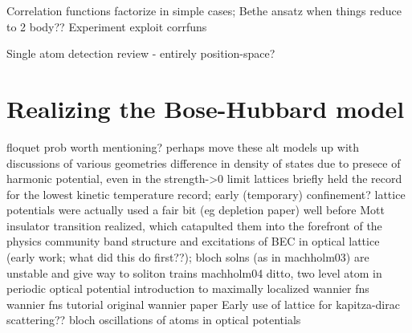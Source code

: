 		Correlation functions factorize in simple cases; Bethe ansatz when things reduce to 2 body??
		Experiment exploit corrfuns 
			\cite{schweigler17}
			\cite{hodgman17}

			Single atom detection
	\cite{ott16} review - entirely position-space?


\section{Realizing the Bose-Hubbard model}
	\cite{grimm00}%
	\cite{miller93}%
	\cite{barrett01}%
	\cite{cabrera}%
	\cite{celi14}%
	\cite{gadway18}%
	\cite{ghose03}%
	floquet prob worth mentioning?
		perhaps move these alt models up with discussions of various geometries 
	\cite{hooley04}
		difference in density of states due to presece of harmonic potential, even in the strength->0 limit
	\cite{kastberg95}
		lattices briefly held the record for the lowest kinetic temperature record; early (temporary) confinement?
		lattice potentials were actually used a fair bit (eg depletion paper) well before Mott insulator transition realized, which catapulted them into the forefront of the physics community
	\cite{machholm03}
		band structure and excitations of BEC in optical lattice (early work; what did this do first??);
		bloch solns (as in machholm03) are unstable and give way to soliton trains machholm04
	ditto, two level atom in periodic optical potential
		\cite{wilkens91}
	introduction to maximally localized wannier fns
		\cite{marzari00}
	\cite{pavarini11}
		wannier fns tutorial
	original wannier paper
		\cite{wannier37}
	\cite{peik97}
		Early use of lattice for kapitza-dirac scattering?? bloch oscillations of atoms in optical potentials



